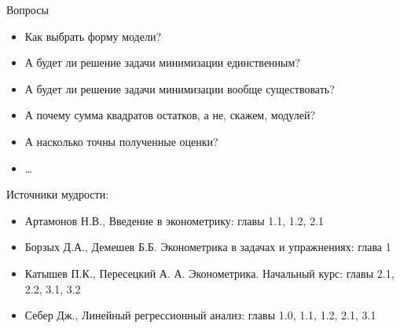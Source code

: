 \begin{frame}{Вопросы}

\begin{itemize}
\item
  Как выбрать форму модели?
\item
  А будет ли решение задачи минимизации единственным?
\item
  А будет ли решение задачи минимизации вообще существовать?
\item
  А почему сумма квадратов остатков, а не, скажем, модулей?
\item
  А насколько точны полученные оценки?
\item
  \ldots{}
\end{itemize}

\end{frame}

\begin{frame}{Источники мудрости:}

\begin{itemize}
\item
  Артамонов Н.В., Введение в эконометрику: главы 1.1, 1.2, 2.1
\item
  Борзых Д.А., Демешев Б.Б. Эконометрика в задачах и упражнениях: глава
  1
\item
  Катышев П.К., Пересецкий А. А. Эконометрика. Начальный курс: главы
  2.1, 2.2, 3.1, 3.2
\item
  Себер Дж., Линейный регрессионный анализ: главы 1.0, 1.1, 1.2, 2.1,
  3.1
\end{itemize}

\end{frame}
